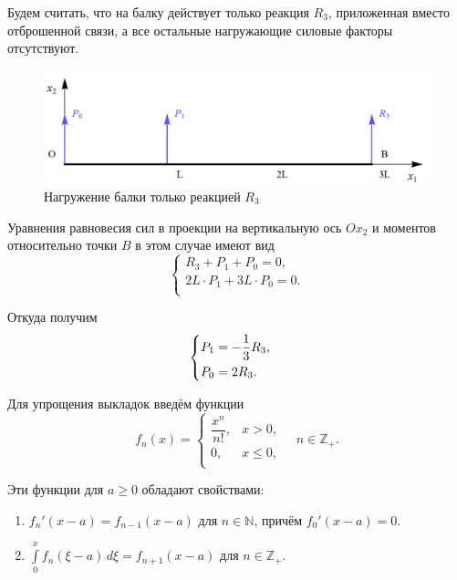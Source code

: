 \documentclass[12pt, a4paper]{article}
\begin{document}
	Будем считать, что на балку действует только реакция $R_3$, приложенная вместо отброшенной связи, а все остальные нагружающие силовые факторы отсутствуют.
	
	\begin{figure}[!h]
		\centering
		\includegraphics[width=0.75\linewidth]{plot-4}
		\caption{Нагружение балки только реакцией $R_3$}
	\end{figure}
	
	Уравнения равновесия сил в проекции на вертикальную ось $Ox_2$ и моментов относительно точки $B$ в этом случае имеют вид
	\vspace{-0.5em}
	\begin{equation*}
		\begin{cases}
			R_3 + P_1 + P_0 = 0, \\ 
			2L \cdot P_1 + 3L \cdot P_0 = 0. \\
		\end{cases}
	\end{equation*}
	
	Откуда получим
	\begin{equation}
		\begin{cases} \vspace{0.25em}
			P_1 = - \dfrac{1}{3} R_3, \\ 
			P_0 = 2 R_3. \\
		\end{cases}
		\label{eqP0P1R}
	\end{equation}
	
	Для упрощения выкладок введём функции
	\[
	f_n(x) = 
	\begin{cases}
		\dfrac{x^n}{n!}, & x > 0, \\ 
		0, & x \leq 0, \\
	\end{cases}
	\quad n \in \mathbb{Z}_+.
	\]
	
	\newpage
	
	Эти функции для $a \geq 0$ обладают свойствами:
	\begin{enumerate}
		\item $f_n'(x - a) = f_{n-1}(x - a)$ для $n \in \mathbb{N}$, причём $f_0'(x - a) = 0$.
		
		\vspace{0.25em}
		
		\item $\int\limits_0^{x} f_n(\xi - a) \, d \xi = f_{n+1}(x - a)$ для $n \in \mathbb{Z}_+$.
	\end{enumerate}
	
\end{document}
